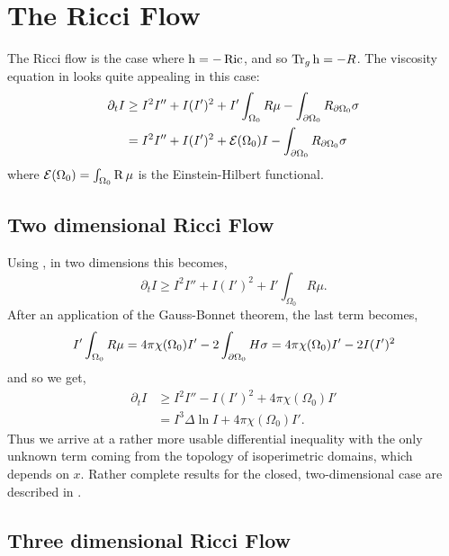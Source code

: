 \documentclass{amsart}
\begin{document}
\section{The Ricci Flow}
\label{subsec:flows_ricci}

The Ricci flow is the case where $\operatorname{h} = -\operatorname{Ric}$, and so $\operatorname{Tr}_g \operatorname{h} = -R$. The viscosity equation in  looks quite appealing in this case:
\begin{equation}
\label{eq:viscosity_ricciflow}
\begin{split}
\partial_t I &\geq I^2I'' + I(I')^2 + I'\int_{\Omega_0} R \mu - \int_{\partial {\Omega_0}} R_{\partial {\Omega_0}}\sigma \\
&= I^2I'' + I(I')^2 + \operatorname{\mathcal{E}}(\Omega_0) I - \int_{\partial {\Omega_0}} R_{\partial {\Omega_0}}\sigma
\end{split}
\end{equation}
where \(\operatorname{\mathcal{E}}({\Omega_0}) = \int_{\Omega_0} \operatorname{R} \mu\) is the Einstein-Hilbert functional.

\subsection*{Two dimensional Ricci Flow}

Using , in two dimensions this becomes,
\[
\partial_t I \geq I^2I'' + I(I')^2 + I'\int_{\Omega_0} R \mu.
\]
After an application of the Gauss-Bonnet theorem, the last term becomes,
\[
I'\int_{\Omega_0} R \mu = 4\pi\chi(\Omega_0)I' - 2\int_{\partial {\Omega_0}} H \sigma = 4\pi\chi(\Omega_0)I'- 2 I (I')^2
\]
and so we get,
\begin{equation}
\label{eq:2d_viscosity_ricciflow}
\begin{split}
\partial_t I &\geq I^2I'' - I(I')^2 + 4\pi\chi(\Omega_0)I' \\
&= I^3 \Delta \ln I + 4\pi\chi(\Omega_0)I'.
\end{split}
\end{equation}
Thus we arrive at a rather more usable differential inequality with the only unknown term coming from the topology of isoperimetric domains, which depends on \(x\). Rather complete results for the closed, two-dimensional case are described in \cite{Bryan:/2016,AndrewsBryan:/2010}.

\subsection*{Three dimensional Ricci Flow}
\end{document}
